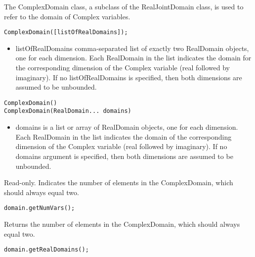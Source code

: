 The ComplexDomain class, a subclass of the RealJointDomain class, is used to refer to the domain of Complex variables.


\ifmatlab
\begin{lstlisting}
ComplexDomain([listOfRealDomains]);
\end{lstlisting}

\begin{itemize}
\item listOfRealDomains comma-separated list of exactly two RealDomain objects, one for each dimension.  Each RealDomain in the list indicates the domain for the corresponding dimension of the Complex variable (real followed by imaginary).  If no listOfRealDomains is specified, then both dimensions are assumed to be unbounded.
\end{itemize}
\fi

\ifjava
\begin{lstlisting}
ComplexDomain()
ComplexDomain(RealDomain... domains)
\end{lstlisting}

\begin{itemize}
\item domains is a list or array of RealDomain objects, one for each dimension.  Each RealDomain in the list indicates the domain of the corresponding dimension of the Complex variable (real followed by imaginary).  If no domains argument is specified, then both dimensions are assumed to be unbounded.
\end{itemize}
\fi

\ifmatlab
{}


Read-only.  Indicates the number of elements in the ComplexDomain, which should always equal two.
\fi

\ifjava
{}


\begin{lstlisting}
domain.getNumVars();
\end{lstlisting}

Returns the number of elements in the ComplexDomain, which should always equal two.


\begin{lstlisting}
domain.getRealDomains();
\end{lstlisting}

